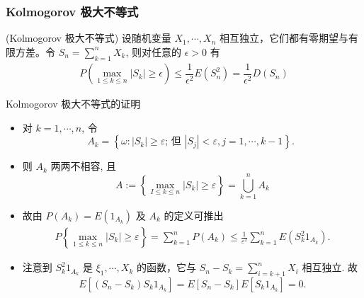 \documentclass[Prob-All.tex]{subfiles}
\begin{document}
\begin{frame}
	\frametitle{{\rm Kolmogorov} 极大不等式}
	\begin{thm}
		({\rm Kolmogorov} 极大不等式) 设随机变量 $X_1,\cdots, X_n$ 相互独立，它们都有零期望与有限方差。令 $S_n=\sum_{k=1}^nX_k$, 则对任意的 $\epsilon>0$ 有
		\begin{eqnarray}\label{eq:klie}
			P(\max_{1\leq k\leq n}|S_k|\geq \epsilon)\leq \dfrac{1}{\epsilon^2}E(S_n^2)=\dfrac{1}{\epsilon^2}D(S_n)
		\end{eqnarray}

	\end{thm}



\end{frame}
\begin{frame}{{\rm Kolmogorov} 极大不等式的证明}
\begin{itemize}[<+-|alert@+>]
	\item 对 $k=1, \cdots, n$, 令
	\[
	A_{k}=\left\{\omega:\left|S_{k}\right| \geq \varepsilon \text {; 但 }\left|S_{j}\right|<\varepsilon, j=1, \cdots, k-1\right\} \text {. }
	\]
\item 则 $A_{k}$ 两两不相容, 且
	\[
	A:=\left\{\max _{I \leq k \leq n}\left|S_{k}\right| \geq \varepsilon\right\}=\bigcup_{k=1}^{n} A_{k}
	\]
\item 故由 $P\left(A_{k}\right)=E\left(1_{A_k}\right)$ 及 $A_{k}$ 的定义可推出
	\begin{align}\label{eq:ki}
		P\left\{\max _{1 \leq k \leq n}\left|S_{k}\right| \geq \varepsilon\right\}=\sum_{k=1}^{n} P\left(A_{k}\right) \leq \frac{1}{\varepsilon^{2}} \sum_{k=1}^{n} E\left(S_{k}^{2} 1_{A_k}\right).
	\end{align}

	\item 注意到 $S_{k}^{2} 1_{A_k}$ 是 $\xi_{1}, \cdots, X_{k}$ 的函数，它与 $S_{n}-S_{k}=\sum_{i=k+1}^{n} X_{i}$ 相互独立. 故
	\[
	E\left[\left(S_{n}-S_{k}\right) S_{k} 1_{A_k}\right]=E\left[S_n-S_{k}\right] E\left[S_{k} 1_{A_k}\right]=0 .
	\]
\end{itemize}

\end{frame}
\end{document}
